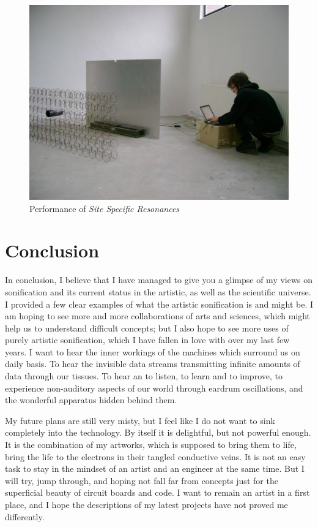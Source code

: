\documentclass[12pt,a4paper,oneside]{report}
\begin{document}
\begin{figure}  
  \centering
    \includegraphics[width=1\textwidth]{img/sitespec}
        \caption{Performance of \emph{Site Specific Resonances}}
        \label{fig:sitespec}
\end{figure}

\chapter{Conclusion}
In conclusion, I believe that I have managed to give you a glimpse of my views on sonification and its current status in the artistic, as well as the scientific universe. I provided a few clear examples of what the artistic sonification is and might be. I am hoping to see more and more collaborations of arts and sciences, which might help us to understand difficult concepts; but I also hope to see more uses of purely artistic sonification, which I have fallen in love with over my last few years. I want to hear the inner workings of the machines which surround us on daily basis. To hear the invisible data streams transmitting infinite amounts of data through our tissues. To hear an to listen, to learn and to improve, to experience non-auditory aspects of our world through eardrum oscillations, and the wonderful apparatus hidden behind them.

My future plans are still very misty, but I feel like I do not want to sink completely into the technology. By itself it is delightful, but not powerful enough. It is the combination of my artworks, which is supposed to bring them to life, bring the life to the electrons in their tangled conductive veins. It is not an easy task to stay in the mindset of an artist and an engineer at the same time. But I will try, jump through, and hoping not fall far from concepts just for the superficial beauty of circuit boards and code. I want to remain an artist in a first place, and I hope the descriptions of my latest projects have not proved me differently. 
\end{document}
